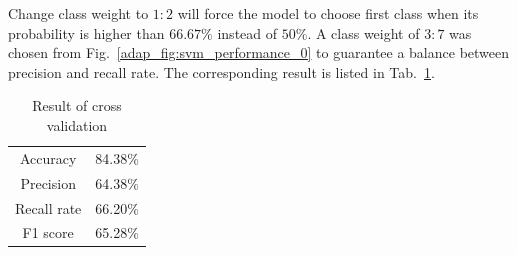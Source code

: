 Change class weight to $1:2$ will force the model to choose first class when its probability is higher than $66.67\%$ instead of $50\%$.
A class weight of $3:7$ was chosen from Fig.~\ref{adap_fig:svm_performance_0} to guarantee a balance between precision and recall rate.
The corresponding result is listed in Tab.~\ref{adap_tab:svm_result}.
\begin{table}[h!]
    \centering
    \caption{Result of cross validation}
    \begin{tabular}{cc}
        \toprule
        Accuracy    &   84.38\%    \\
        Precision   &   64.38\%     \\
        Recall rate &   66.20\%     \\
        F1 score    &   65.28\%     \\
        \bottomrule
    \end{tabular}
    \label{adap_tab:svm_result}
\end{table}
\pagebreak